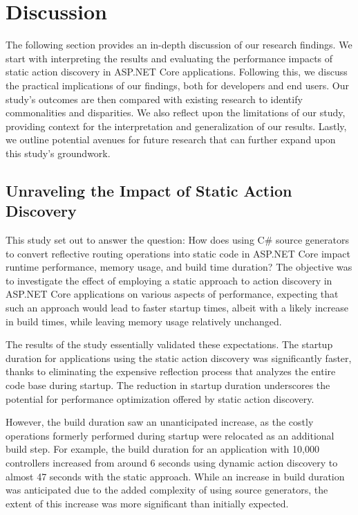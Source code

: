 \chapter{Discussion}

The following section provides an in-depth discussion of our research findings. We start with interpreting the results and evaluating the performance impacts of static action discovery in ASP.NET Core applications. Following this, we discuss the practical implications of our findings, both for developers and end users. Our study's outcomes are then compared with existing research to identify commonalities and disparities. We also reflect upon the limitations of our study, providing context for the interpretation and generalization of our results. Lastly, we outline potential avenues for future research that can further expand upon this study's groundwork.

\section{Unraveling the Impact of Static Action Discovery}

This study set out to answer the question: How does using C\# source generators to convert reflective routing operations into static code in ASP.NET Core impact runtime performance, memory usage, and build time duration? The objective was to investigate the effect of employing a static approach to action discovery in ASP.NET Core applications on various aspects of performance, expecting that such an approach would lead to faster startup times, albeit with a likely increase in build times, while leaving memory usage relatively unchanged.

The results of the study essentially validated these expectations. The startup duration for applications using the static action discovery was significantly faster, thanks to eliminating the expensive reflection process that analyzes the entire code base during startup. The reduction in startup duration underscores the potential for performance optimization offered by static action discovery.

However, the build duration saw an unanticipated increase, as the costly operations formerly performed during startup were relocated as an additional build step. For example, the build duration for an application with 10,000 controllers increased from around 6 seconds using dynamic action discovery to almost 47 seconds with the static approach. While an increase in build duration was anticipated due to the added complexity of using source generators, the extent of this increase was more significant than initially expected.


